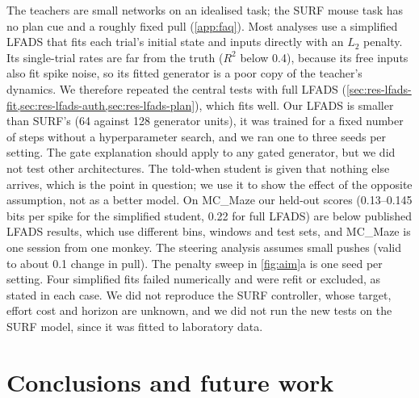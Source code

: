 \documentclass[11pt,a4paper]{article}
\begin{document}
The teachers are small networks on an idealised task; the SURF mouse task has no plan cue and a roughly fixed pull (\cref{app:faq}). Most analyses use a simplified LFADS that fits each trial's initial state and inputs directly with an $L_2$ penalty. Its single-trial rates are far from the truth ($R^2$ below 0.4), because its free inputs also fit spike noise, so its fitted generator is a poor copy of the teacher's dynamics. We therefore repeated the central tests with full LFADS (\cref{sec:res-lfads-fit,sec:res-lfads-auth,sec:res-lfads-plan}), which fits well. Our LFADS is smaller than SURF's (64 against 128 generator units), it was trained for a fixed number of steps without a hyperparameter search, and we ran one to three seeds per setting. The gate explanation should apply to any gated generator, but we did not test other architectures. The told-when student is given that nothing else arrives, which is the point in question; we use it to show the effect of the opposite assumption, not as a better model. On MC\_Maze our held-out scores (0.13--0.145 bits per spike for the simplified student, 0.22 for full LFADS) are below published LFADS results, which use different bins, windows and test sets, and MC\_Maze is one session from one monkey. The steering analysis assumes small pushes (valid to about 0.1 change in pull). The penalty sweep in \cref{fig:aim}a is one seed per setting. Four simplified fits failed numerically and were refit or excluded, as stated in each case. We did not reproduce the SURF controller, whose target, effort cost and horizon are unknown, and we did not run the new tests on the SURF model, since it was fitted to laboratory data.

\section{Conclusions and future work}\label{sec:conclusion}
\end{document}
